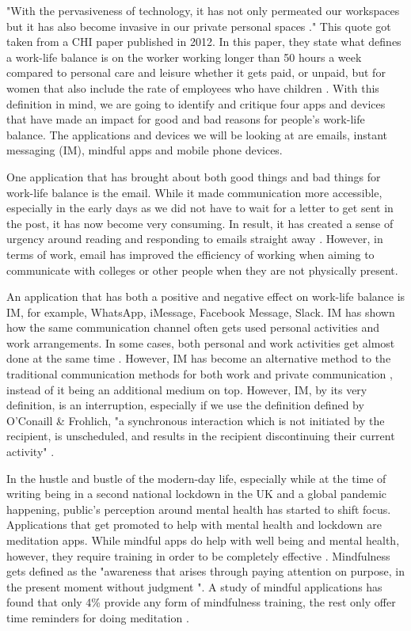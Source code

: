 \documentclass{sigchi}
\begin{document}
	"With the pervasiveness of technology, it has not only permeated our workspaces but it has also become invasive in our private personal spaces \cite{peters2012sig}." This quote got taken from a CHI paper published in 2012. In this paper, they state what defines a work-life balance is on the worker working longer than 50 hours a week compared to personal care and leisure whether it gets paid, or unpaid, but for women that also include the rate of employees who have children \cite{peters2012sig}. With this definition in mind, we are going to identify and critique four apps and devices that have made an impact for good and bad reasons for people's work-life balance. The applications and devices we will be looking at are emails, instant messaging (IM), mindful apps and mobile phone devices.
	
	One application that has brought about both good things and bad things for work-life balance is the email. While it made communication more accessible, especially in the early days as we did not have to wait for a letter to get sent in the post, it has now become very consuming. In result, it has created a sense of urgency around reading and responding to emails straight away \cite{stawarz2013d}. However, in terms of work, email has improved the efficiency of working when aiming to communicate with colleges or other people when they are not physically present.
	
	An application that has both a positive and negative effect on work-life balance is IM, for example, WhatsApp, iMessage, Facebook Message, Slack. IM has shown how the same communication channel often gets used personal activities and work arrangements. In some cases, both personal and work activities get almost done at the same time \cite{lindley2012s}. However, IM has become an alternative method to the traditional communication methods for both work \cite{siggroup2005group} and private communication \cite{flanagin2005online}, instead of it being an additional medium on top. However, IM, by its very definition, is an interruption, especially if we use the definition defined by O'Conaill \& Frohlich, "a synchronous interaction which is not initiated by the recipient, is unscheduled, and results in the recipient discontinuing their current activity" \cite{rennecker2003theorizing}. 
	
	In the hustle and bustle of the modern-day life, especially while at the time of writing being in a second national lockdown in the UK and a global pandemic happening, public's perception around mental health has started to shift focus. Applications that get promoted to help with mental health and lockdown are meditation apps. While mindful apps do help with well being and mental health, however, they require training in order to be completely effective \cite{dauden2018evaluating}.  Mindfulness gets defined as the "awareness that arises through paying attention on purpose, in the present moment without judgment \cite{baer2003mindfulness}". A study of mindful applications has found that only 4\% provide any form of mindfulness training, the rest only offer time reminders for doing meditation \cite{mani2015review}. %
	
\end{document}
